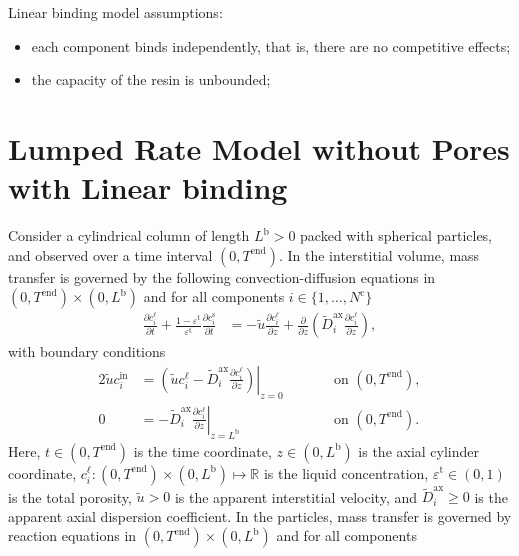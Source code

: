 \documentclass{article}
\begin{document}
Linear binding model assumptions:
\begin{itemize}
    \item each component binds independently, that is, there are no competitive effects;
    \item the capacity of the resin is unbounded;
\end{itemize}

\section*{Lumped Rate Model without Pores with Linear binding}
Consider a cylindrical column of length $L^{\mathrm{b}} > 0$ packed with spherical particles, and observed over a time interval $(0, T^{\mathrm{end}})$.
In the interstitial volume, mass transfer is governed by the following convection-diffusion equations in $(0, T^{\mathrm{end}})\times (0, L^{\mathrm{b}})$ and for all components $i\in\{1, \dots, N^{\mathrm{c}} \}$
\begin{align}
    \frac{\partial c^{\mathrm{\ell}}_{i}}{\partial t}
        + \frac{1 - \varepsilon^{\mathrm{t}}}{\varepsilon^{\mathrm{t}}} \frac{\partial c^{\mathrm{s}}_{i}}{\partial t}
    &= - \tilde{u} \frac{\partial c^{\mathrm{\ell}}_{i} }{\partial z}
        + \frac{\partial}{\partial z} \left( \tilde{D}^{\mathrm{ax}}_{i} \frac{\partial c^{\mathrm{\ell}}_{i}}{\partial z} \right),
\end{align}
with boundary conditions
\begin{alignat}{2}
    \tilde{u} c^{\mathrm{in}}_{i}
    &= \left.\left( \tilde{u} c^{\mathrm{\ell}}_{i} - \tilde{D}^{\mathrm{ax}}_{i} \frac{\partial c^{\mathrm{\ell}}_{i}}{\partial z}\right)\right|_{z=0}
    & & \qquad\text{on }(0, T^{\mathrm{end}}),
    \\
    0
    &= - \tilde{D}^{\mathrm{ax}}_{i} \left. \frac{\partial c^{\mathrm{\ell}}_{i}}{\partial z} \right|_{z=L^{\mathrm{b}}}
    & & \qquad\text{on }(0, T^{\mathrm{end}}).
\end{alignat}
Here, $t\in (0, T^{\mathrm{end}})$ is the time coordinate, $z\in (0, L^{\mathrm{b}})$ is the axial cylinder coordinate, $c^{\mathrm{\ell}}_{i}\colon (0, T^{\mathrm{end}})\times (0, L^{\mathrm{b}}) \mapsto \mathbb{R}$ is the liquid concentration, $\varepsilon^{\mathrm{t}}\in (0, 1)$ is the total porosity, $\tilde{u}> 0$ is the apparent interstitial velocity, and $\tilde{D}^{\mathrm{ax}}_{i}\geq 0$ is the apparent axial dispersion coefficient.
In the particles, mass transfer is governed by reaction equations in $(0, T^{\mathrm{end}}) \times (0, L^{\mathrm{b}})$ and for all components
\end{document}
